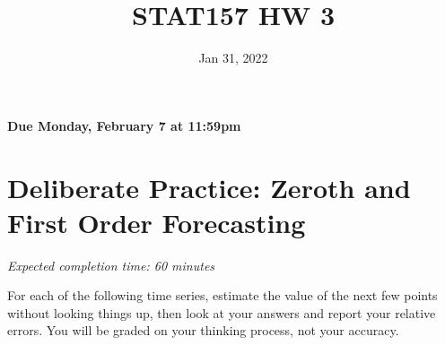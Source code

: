 \documentclass[11pt]{article}
\title{STAT157 HW 3}
\date{Jan 31, 2022}
\begin{document}
\maketitle

\hfill \textbf{Due Monday, February 7 at 11:59pm}

\section*{Deliberate Practice: Zeroth and First Order Forecasting}

\emph{Expected completion time: 60 minutes}

For each of the following time series, estimate the value of the next few points without looking things up, then look at your answers and report your relative errors. You will be graded on your thinking process, not your accuracy.
\end{document}
